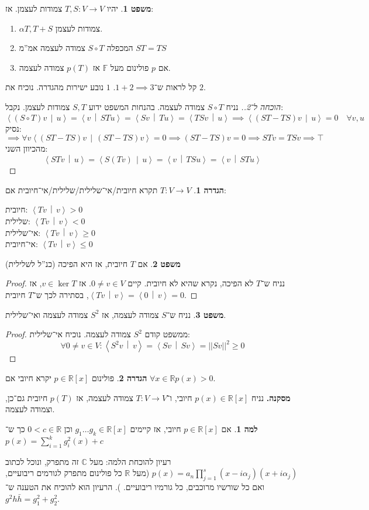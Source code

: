 \documentclass[a4paper]{article}
\newcommand\R     {\mathbb{R}}
\newcommand\C     {\mathbb{C}}
\newcommand\ra    {\rangle}
\newcommand\la    {\langle}
\newcommand\F         {\mathbb{F}}
\newcommand\co        {\colon}
\newcommand\norm[1]   {\left \vert \left \vert #1 \right \vert \right \vert}
\newcommand\mut [2]   {\left \la #1 \,\middle\vert\, #2 \right \ra}
\newcommand\ag        {\alpha}
\theoremstyle{definition}
\newtheorem{Theorem}{משפט}
\newtheorem{definition}{הגדרה}
\newtheorem{Lemma}{למה}
\newcommand\theo  [1] {\begin{Theorem}#1\end{Theorem}}
\newcommand\defi  [1] {\begin{definition}#1\end{definition}}
\newcommand\lem   [1] {\begin{Lemma}#1\end{Lemma}}
\begin{document}
	\theo{יהיו $T, S \co V \to V$ צמודות לעצמן. אז: 
		\begin{enumerate}
			\item $\ag T, T + S$ צמודות לעצמן. 
			\item המכפלה $S\circ T$ צמודה לעצמה אמ''מ $ST = TS$
			\item אם $p$ פולינום מעל $\F$ אז $p(T)$ צמודה לעצמה. 
	\end{enumerate}}
	קל לראות ש־$1 + 2 \implies 3$. $1$ נובע ישירות מהגדרה. נוכיח את $2$. \begin{proof}[הוכחה ל־2.]
		נניח $S \circ T$ צמודה לעצמה. בהנחות המשפט ידוע $S, T$ צמודות לעצמן. נקבל: 
		\[ \mut{(S \circ T)v}{u} = \mut{v}{STu} = \mut{Sv}{Tu} = \mut{TSv}{u} \implies \mut{(ST - TS)v}{u} = 0 \quad \forall v, u \]
		נסיק: 
		\[ \implies \forall v\mut{(ST - TS)v}{(ST - TS)v} = 0  \implies (ST - TS)v = 0 \implies STv = TSv \implies \top \]
		מהכיוון השני: 
		\[ \mut{STv}{u} = \mut{S(Tv)}{u} = \mut{v}{TSu} = \mut{v}{STu} \]
	\end{proof}
	\defi{$T \co V \to V$ תקרא חיובית/אי־שלילית/שלילית/אי־חיובית אם: 
		\begin{multicols}{2}
				 חיובית: $\mut{Tv}{v} > 0$ \\
				שלילית: $\mut{Tv}{v} < 0$ \\
				אי־שלילית: $\mut{Tv}{v} \ge 0$ \\
				אי־חיובית: $\mut{Tv}{v} \le 0$
		\end{multicols}
	}
	\theo{אם $T$ חיובית, אז היא הפיכה (כנ''ל לשלילית)} \begin{proof}
		נניח ש־$T$ לא הפיכה, נקרא שהיא לא חיובית. קיים $0 \neq v \in V$. אז $v \in \ker T$, אז $\mut{Tv}{v} = \mut{0}{v} = 0$, בסתירה לכך ש־$T$ חיובית. 
	\end{proof}
	\theo{נניח ש־$S$ צמודה לעצמה, אז $S^{2}$ צמודה לעצמה ואי־שלילית. }
	\begin{proof}
		ממשפט קודם $S^{2}$ צמודה לעצמה. נוכיח אי־שלילית: 
		\[ \forall 0 \neq v \in V \co \mut{S^{2}v}{v} = \mut{Sv}{Sv} = \norm{Sv}^{2} \ge 0 \]
	\end{proof}
	\defi{פולינום $p \in \R[x]$ יקרא חיובי אם $\forall x \in \R p(x) > 0$. }
	\textbf{מסקנה. }נניח $p(x) \in \R[x]$ חיובי, ו־$T \co V \to V$ צמודה לעצמה, אז $p(T)$ חיובית גם־כן, וצמודה לעצמה. 
	\lem{אם $p \in \R[x]$ חיובי, אז קיימים $g_1 \dots g_k \in \R[x]$ וכן $0 < c \in \R$ כך ש־$p(x) = \sum_{i = 1}^{k}g^2_i(x) + c$}
	רעיון להוכחת הלמה: מעל $\C$ זה מתפרק, ונוכל לכתוב $p(x) = a_n\prod_{j = 1}^{s} (x - i\ag_j)(x + i\ag_j)$ (מעל $\R$ כל פולינום מתפרק לגורמים ריבועיים, ואם כל שורשיו מרוכבים, כל גורמיו ריבועיים. ). הרעיון הוא להוכיח את הטענה ש־$g^2 h \bar h = g_1^2 + g_2^2$.
\end{document}
